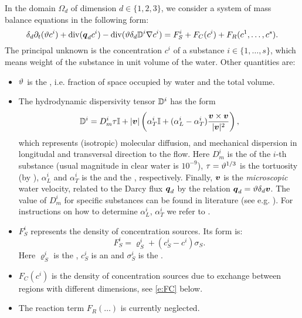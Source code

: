 In the domain $\Omega_d$ of dimension $d\in\{1,2,3\}$, we consider a system of mass balance equations in the following form:
\begin{equation}
    \label{e:ADE}
   \delta_d\partial_t ( \th c^i) + \div ( \vc q_d c^i ) - \div (\th \delta_d \D^i \grad c^i ) = F_S^i + F_C(c^i) + F_R(c^1,\dots, c^s).
\end{equation}
The principal unknown is the concentration $c^i$  of a substance $i\in\{1,\dots, s\}$, which means weight of the substance in unit volume of the water.
Other quantities are:
\begin{itemize}

\item $\vartheta$ \units{}{}{} is the , i.e. fraction of space occupied by water and the total volume.
\item The hydrodynamic dispersivity tensor ${{\mathbb{D}}}^i$  has the form
\begin{equation} 
  \label{eqn:transport_disp}
  \D^i =D_m^i \tau \tn I + \abs{\vc v}\left(\alpha_T^i \tn I + (\alpha_L^i - \alpha_T^i) \frac{\vc v \times \vc v}{\abs{\vc v}^2}\right),
\end{equation}
which represents (isotropic) molecular diffusion, and mechanical dispersion in longitudal and transversal direction to the flow.
Here $D_m^i$  is the  of the $i$-th substance (usual magnitude in clear water is $10^{-9}$), $\tau=\vartheta^{1/3}$ is the tortuosity (by \cite{millington_quirk}), $\alpha_L^i$  and $\alpha_T^i$  is the  and the , respectively.
Finally, $\mathbf{\boldsymbol{v}}$  is the \emph{microscopic} water velocity, related to the Darcy flux $\mathbf{\boldsymbol{q}}_d$ by the relation $\mathbf{\boldsymbol{q}}_d = \vartheta\delta_d\mathbf{\boldsymbol{v}}$.
The value of $D_m^i$ for specific substances can be found in literature (see e.g. \cite{cislerova_vogel}).
For instructions on how to determine $\alpha_L^i$, $\alpha_T^i$ we refer to \cite{marsily,domenico_schwartz}.

\item $F_S^i$  represents the density of concentration sources.
Its form is:
\begin{equation}
 F_S^i = \varrho^i_S + (c_S^i-c^i)\sigma_S. \label{eqn:transport_sources}
\end{equation}
Here $\varrho_S^i$  is the , $c_S^i$ is an  and $\sigma_S^i$ is the .

\item $F_C(c^i)$  is the density of concentration sources due to exchange between regions with different dimensions, see \eqref{e:FC} below.

\item The reaction term $F_R(\dots)$  is currently neglected.
\end{itemize}
